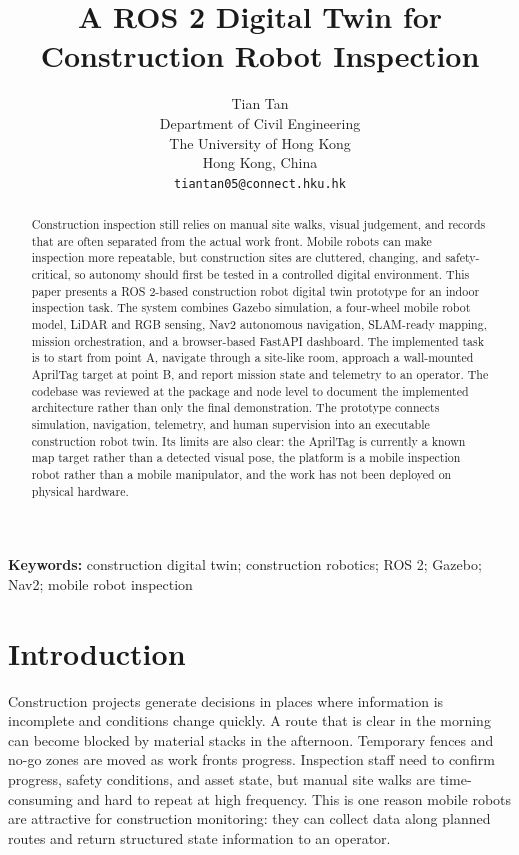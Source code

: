 \documentclass[12pt,a4paper]{article}
\title{\textbf{A ROS 2 Digital Twin for Construction Robot Inspection}}
\author{
Tian Tan\\
Department of Civil Engineering\\
The University of Hong Kong\\
Hong Kong, China\\
\texttt{tiantan05@connect.hku.hk}
}
\date{}
\begin{document}
\maketitle

\begin{abstract}
Construction inspection still relies on manual site walks, visual judgement, and records that are often separated from the actual work front. Mobile robots can make inspection more repeatable, but construction sites are cluttered, changing, and safety-critical, so autonomy should first be tested in a controlled digital environment. This paper presents a ROS 2-based construction robot digital twin prototype for an indoor inspection task. The system combines Gazebo simulation, a four-wheel mobile robot model, LiDAR and RGB sensing, Nav2 autonomous navigation, SLAM-ready mapping, mission orchestration, and a browser-based FastAPI dashboard. The implemented task is to start from point A, navigate through a site-like room, approach a wall-mounted AprilTag target at point B, and report mission state and telemetry to an operator. The codebase was reviewed at the package and node level to document the implemented architecture rather than only the final demonstration. The prototype connects simulation, navigation, telemetry, and human supervision into an executable construction robot twin. Its limits are also clear: the AprilTag is currently a known map target rather than a detected visual pose, the platform is a mobile inspection robot rather than a mobile manipulator, and the work has not been deployed on physical hardware.
\end{abstract}

\noindent\textbf{Keywords:} construction digital twin; construction robotics; ROS 2; Gazebo; Nav2; mobile robot inspection

\section{Introduction}

Construction projects generate decisions in places where information is incomplete and conditions change quickly. A route that is clear in the morning can become blocked by material stacks in the afternoon. Temporary fences and no-go zones are moved as work fronts progress. Inspection staff need to confirm progress, safety conditions, and asset state, but manual site walks are time-consuming and hard to repeat at high frequency. This is one reason mobile robots are attractive for construction monitoring: they can collect data along planned routes and return structured state information to an operator.
\end{document}
